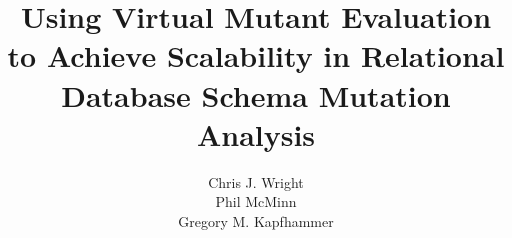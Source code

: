 \documentclass{sig-alternate}
\begin{document}
\title{Using Virtual Mutant Evaluation to Achieve Scalability in Relational Database Schema Mutation Analysis \vspace*{-.1in}}




\author{
\alignauthor
Chris J. Wright\\
\alignauthor
Phil McMinn\\
\alignauthor
Gregory M. Kapfhammer\\
}

\maketitle

\vspace*{-.75in}











\end{document}
